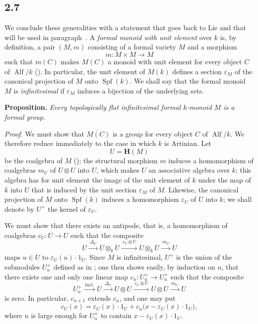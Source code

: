 
\subsection*{2.7}
\label{sga3:VIIB:2.7}

We conclude these generalities with a statement that goes back to Lie
and that will be used in paragraph~. A \emph{formal monoid with unit
element} over \(k\) is, by definition, a pair \((M,m)\) consisting of a
formal variety \(M\) and a morphism
\[
  m:M\times M\longrightarrow M
\]
such that \(m(C)\) makes \(M(C)\) a monoid with unit element for every
object \(C\) of \(\operatorname{Alf}/k\) \textup{()}. In particular, the
unit element of \(M(k)\) defines a section \(\varepsilon_M\) of the
canonical projection of \(M\) onto \(\operatorname{Spf}(k)\). We shall say
that the formal monoid \(M\) is \emph{infinitesimal} if \(\varepsilon_M\)
induces a bijection of the underlying sets.

\medskip
\noindent\textbf{Proposition.}
\label{sga3:VIIB:2.7:prop}
{\itshape Every topologically flat infinitesimal formal
\(k\)-monoid \(M\) is a formal group.}

\textit{Proof.}
We must show that \(M(C)\) is a group for every object \(C\) of
\(\operatorname{Alf}/k\). We therefore reduce immediately to the
case in which \(k\) is Artinian. Let
\[
  U=\mathbf H(M)
\]
be the coalgebra of \(M\) \textup{()}; the structural morphism \(m\)
induces a homomorphism of coalgebras \(m_U\) of \(U\otimes U\) into \(U\),
which makes \(U\) an associative algebra over \(k\); this algebra has for
unit element the image of the unit element of \(k\) under the map of \(k\)
into \(U\) that is induced by the unit section \(\varepsilon_M\) of \(M\).
Likewise, the canonical projection of \(M\) onto \(\operatorname{Spf}(k)\)
induces a homomorphism \(\varepsilon_U\) of \(U\) into \(k\); we shall
denote by \(U^+\) the kernel of \(\varepsilon_U\).

We must show that there exists an antipode, that is, a homomorphism of
coalgebras \(c_U:U\to U\) such that the composite
\label{sga3:VIIB:2.7:antipode-left-identity}
\[
  U\xrightarrow{\ \Delta_U\ }U\otimes_kU
  \xrightarrow{\ c_U\otimes U\ }U\otimes_kU
  \xrightarrow{\ m_U\ }U
\]
maps \(u\in U\) to \(\varepsilon_U(u)\cdot1_U\). Since \(M\) is
infinitesimal, \(U^+\) is the union of the submodules \(U_n^+\) defined as
in ; one then shows easily, by induction on \(n\), that there
exists one and only one linear map \(c_n:U_n^+\to U_n^+\) such that the
composite
\[
  U_n^+\xrightarrow{\ \mathrm{incl.}\ }U
  \xrightarrow{\ \Delta_U\ }U\otimes U
  \xrightarrow{\ c_U\otimes U\ }U\otimes U
  \xrightarrow{\ m_U\ }U
\]
is zero. In particular, \(c_{n+1}\) extends \(c_n\), and one may put
\[
  c_U(x)=\varepsilon_U(x)\cdot1_U+c_n\bigl(x-\varepsilon_U(x)\cdot1_U\bigr),
\]
where \(n\) is large enough for \(U_n^+\) to contain
\(x-\varepsilon_U(x)\cdot1_U\).

